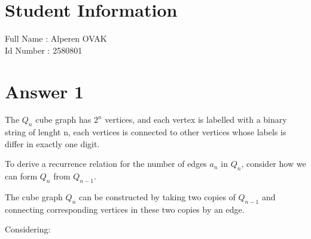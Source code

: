 \documentclass[12pt]{article}
\begin{document}
\section*{Student Information } 
Full Name :  Alperen OVAK\\
Id Number :  2580801\\

\section*{Answer 1}

The \( Q_n \) cube graph has \( 2^n \) vertices, and each vertex is labelled with a binary string of lenght n, each vertices is connected to other vertices whose labels is differ in exactly one digit.

To derive a recurrence relation for the number of edges \( a_n \) in \( Q_n \), consider how we can form \( Q_n \) from \( Q_{n-1} \).

The cube graph \( Q_n \) can be constructed by taking two copies of \( Q_{n-1} \) and connecting corresponding vertices in these two copies by an edge.

Considering:
\end{document}

